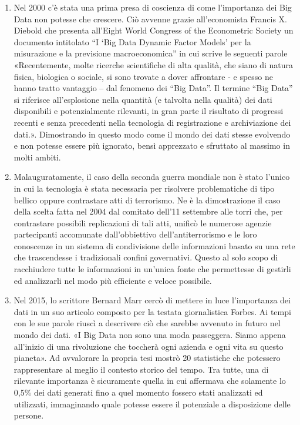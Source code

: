 \begin{enumerate}
    \item Nel 2000 c’è stata una prima presa di coscienza di come l’importanza dei Big Data non potesse che crescere. Ciò avvenne grazie all’economista Francis X. Diebold che presenta all’Eight World Congress of the Econometric Society un documento intitolato “I ‘Big Data Dynamic Factor Models’ per la misurazione e la previsione macroeconomica” in cui scrive le seguenti parole «Recentemente, molte ricerche scientifiche di alta qualità, che siano di natura fisica, biologica o sociale, si sono trovate a dover affrontare - e spesso ne hanno tratto vantaggio – dal fenomeno dei “Big Data”. Il termine “Big Data” si riferisce all’esplosione nella quantità (e talvolta nella qualità) dei dati disponibili e potenzialmente rilevanti, in gran parte il risultato di progressi recenti e senza precedenti nella tecnologia di registrazione e archiviazione dei dati.».\cite{citeseerx_big_data_dynamic_factor} Dimostrando in questo modo come il mondo dei dati stesse evolvendo e non potesse essere più ignorato, bensì apprezzato e sfruttato al massimo in molti ambiti.
    \item Malauguratamente, il caso della seconda guerra mondiale non è stato l’unico in cui la tecnologia è stata necessaria per risolvere problematiche di tipo bellico oppure contrastare atti di terrorismo. Ne è la dimostrazione il caso della scelta fatta nel 2004 dal comitato dell’11 settembre alle torri che, per contrastare possibili replicazioni di tali atti, unificò le numerose agenzie partecipanti accomunate dall’obbiettivo dell’antiterrorismo e le loro conoscenze in un sistema di condivisione delle informazioni basato su una rete che trascendesse i tradizionali confini governativi. Questo al solo scopo di racchiudere tutte le informazioni in un’unica fonte che permettesse di gestirli ed analizzarli nel modo più efficiente e veloce possibile.\cite{researchgate_twin_towers}
    \item Nel 2015, lo scrittore Bernard Marr cercò di mettere in luce l’importanza dei dati in un suo articolo composto per la testata giornalistica Forbes. Ai tempi con le sue parole riuscì a descrivere ciò che sarebbe avvenuto in futuro nel mondo dei dati. «I Big Data non sono una moda passeggera. Siamo appena all'inizio di una rivoluzione che toccherà ogni azienda e ogni vita su questo pianeta». Ad avvalorare la propria tesi mostrò 20 statistiche che potessero rappresentare al meglio il contesto storico del tempo. Tra tutte, una di rilevante importanza è sicuramente quella in cui affermava che solamente lo 0,5\% dei dati generati fino a quel momento fossero stati analizzati ed utilizzati, immaginando quale potesse essere il potenziale a disposizione delle persone.\cite{forbes_big_data}
\end{enumerate}

